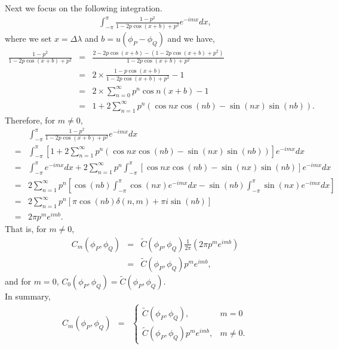 Next we focus on the following integration.
\begin{eqnarray*}
	\int_{-\pi}^\pi \frac{1-p^2}{1 - 2p \cos(x+b)+p^2} e^{-imx}dx,
\end{eqnarray*}
where we set $x=\Delta\lambda$ and $b=u(\phi_P -\phi_Q)$ and we have,
\begin{eqnarray*}
	\frac{1-p^2}{1 - 2p \cos(x+b)+p^2} &=& \frac{2-2p\cos(x+b)-(1-2p \cos(x+b)+p^2)}{1-2p \cos(x+b)+p^2}\\
	&=& 2\times \frac{1-p\cos(x+b)}{1-2p \cos(x+b)+p^2}-1 \\
	&=& 2\times \sum_{n=0}^{\infty}p^n\cos n(x+b)-1  \\
	&=& 1 + 2 \sum_{n=1}^{\infty}p^n (\cos nx \cos(nb) - \sin(nx) \sin(nb)).
\end{eqnarray*}
Therefore, for $m \ne 0$,
\begin{eqnarray*}
	& & \int_{-\pi}^\pi \frac{1-p^2}{1 - 2p \cos(x+b)+p^2} e^{-imx}dx \\
	&=& \int_{-\pi}^\pi \left[1 + 2 \sum_{n=1}^{\infty}p^n (\cos nx \cos(nb) - \sin(nx) \sin(nb))\right]  e^{-imx}dx \\
	&=& \int_{-\pi}^\pi e^{-imx}dx + 2 \sum_{n=1}^{\infty}p^n \int_{-\pi}^\pi \left[\cos nx \cos(nb) - \sin(nx) \sin(nb)\right]  e^{-imx}dx \\
	&=& 2 \sum_{n=1}^{\infty}p^n \left[\cos(nb)  \int_{-\pi}^\pi \cos(nx) e^{-imx} dx - \sin(nb)  \int_{-\pi}^\pi \sin(nx) e^{-imx}dx \right] \\
	&=& 2 \sum_{n=1}^{\infty}p^n \left[ \pi \cos(nb) \delta(n, m) + \pi i\sin(nb)\right] \\
	&=& 2\pi p^m e^{imb}.
\end{eqnarray*}
That is, for $m \ne 0$,
\begin{eqnarray*}
	C_m(\phi_P, \phi_Q)  &=& \tilde{C}(\phi_P, \phi_Q) \frac{1}{2\pi} (2\pi p^m e^{imb}) \\
	&=& \tilde{C}(\phi_P, \phi_Q) p^m e^{imb},
\end{eqnarray*}
and for $m = 0$, $C_0(\phi_P, \phi_Q) = \tilde{C}(\phi_P, \phi_Q)$.\\

In summary,
\begin{eqnarray*}
	C_m(\phi_P, \phi_Q) &=& \left\{ \begin{array}{ll}
	\tilde{C}(\phi_P, \phi_Q), & m = 0 \\
	\tilde{C}(\phi_P, \phi_Q)p^m e^{imb}, & m \ne 0.
	\end{array}
	\right.
\end{eqnarray*}

